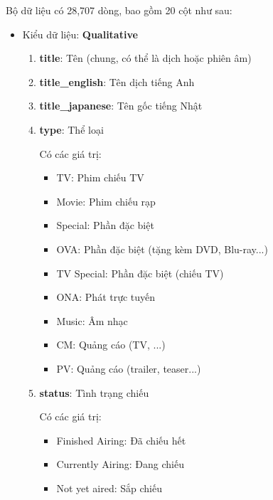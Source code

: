     \FloatBarrier

     Bộ dữ liệu có 28,707 dòng, bao gồm 20 cột như sau:
     \begin{itemize}
        \item Kiểu dữ liệu: \textbf{Qualitative} 

        \begin{enumerate}
            \item \textbf{title}: Tên (chung, có thể là dịch hoặc phiên âm)
            \item \textbf{title\_english}: Tên dịch tiếng Anh
            \item \textbf{title\_japanese}: Tên gốc tiếng Nhật
            \item \textbf{type}: Thể loại
            
                Có các giá trị: 
                \begin{itemize}
                    \item TV: Phim chiếu TV
                    \item Movie: Phim chiếu rạp
                    \item Special: Phần đặc biệt
                    \item OVA: Phần đặc biệt (tặng kèm DVD, Blu-ray...)
                    \item TV Special: Phần đặc biệt (chiếu TV)
                    \item ONA: Phát trực tuyến 
                    \item Music: Âm nhạc
                    \item CM: Quảng cáo (TV, ...)
                    \item PV: Quảng cáo (trailer, teaser...)
                \end{itemize}

            \item \textbf{status}: Tình trạng chiếu
            
                Có các giá trị: 
                \begin{itemize}
                    \item Finished Airing: Đã chiếu hết

                    \item Currently Airing: Đang chiếu

                    \item Not yet aired: Sắp chiếu
                \end{itemize}


\end{enumerate}
\end{itemize}
